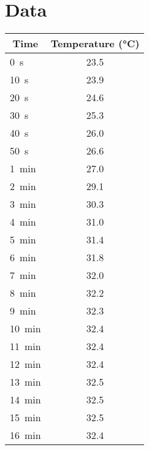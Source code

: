 \documentclass[11pt, titlepage]{article}
\begin{document}
    \section{Data}
    \label{sec:data}
        \begin{center}
            \begin{minipage}[t]{2in}
                \centering
                \label{tab:raw-partA}
                \begin{tabular}{l c}
                    \toprule
                    \multicolumn{1}{c}{Time} & Temperature (\si{\degreeCelsius}) \\
                    \midrule
                    \SI{0}{\second} & 23.5 \\
                    \SI{10}{\second} & 23.9 \\
                    \SI{20}{\second} & 24.6 \\
                    \SI{30}{\second} & 25.3 \\
                    \SI{40}{\second} & 26.0 \\
                    \SI{50}{\second} & 26.6 \\
                    \SI{1}{\minute} & 27.0 \\
                    \SI{2}{\minute} & 29.1 \\
                    \SI{3}{\minute} & 30.3 \\
                    \SI{4}{\minute} & 31.0 \\
                    \SI{5}{\minute} & 31.4 \\
                    \SI{6}{\minute} & 31.8 \\
                    \SI{7}{\minute} & 32.0 \\
                    \SI{8}{\minute} & 32.2 \\
                    \SI{9}{\minute} & 32.3 \\
                    \SI{10}{\minute} & 32.4 \\
                    \SI{11}{\minute} & 32.4 \\
                    \SI{12}{\minute} & 32.4 \\
                    \SI{13}{\minute} & 32.5 \\
                    \SI{14}{\minute} & 32.5 \\
                    \SI{15}{\minute} & 32.5 \\
                    \SI{16}{\minute} & 32.4 \\

\end{tabular}
\end{minipage}
\end{center}
\end{document}
